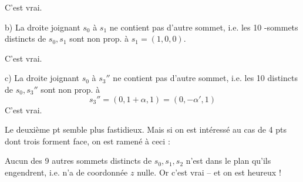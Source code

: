 \uline{} C'est vrai.
\margin{$\unsure{*}$}

b) La droite joignant $s_0$ à $s_1$ ne contient pas d'autre sommet, i.e. les 10 -sommets distincts de $s_0,s_1$ sont non prop. à $s_1=(1,0,0)$.

C'est vrai.

c) La droite joignant $s_0$ à $s_3''$ ne contient pas d'autre sommet, i.e. les 10  distincts de $s_0,s_3''$ sont non prop. à
\[
s_3''=(0,1+\alpha,1)
=(0,-\alpha',1)
\]
C'est vrai.

Le deuxième pt semble plus fastidieux. Mais si on est  intéressé au cas de 4 pts  dont trois forment face, on est ramené à ceci :

Aucun des 9 autres sommets distincts de $s_0,s_1,s_2$ n'est dans le plan qu'ils engendrent, i.e. n'a de coordonnée $z$ nulle. Or c'est vrai -- et on est heureux !
